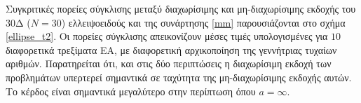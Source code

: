 Συγκριτικές πορείες σύγκλισης μεταξύ διαχωρίσιμης και μη-διαχωρίσιμης εκδοχής του $30$Δ ($N\!=\!30$) ελλειψοειδούς και της συνάρτησης \ref{mm} παρουσιάζονται στο σχήμα \ref{ellipse_t2}. Οι πορείες σύγκλισης απεικονίζουν μέσες τιμές υπολογισμένες για $10$ διαφορετικά τρεξίματα ΕΑ, με διαφορετική αρχικοποίηση της γεννήτριας τυχαίων αριθμών.  Παρατηρείται ότι, και στις δύο περιπτώσεις η διαχωρίσιμη εκδοχή των προβλημάτων υπερτερεί σημαντικά σε ταχύτητα της μη-διαχωρίσιμης εκδοχής αυτών. Το κέρδος  είναι σημαντικά μεγαλύτερο στην περίπτωση όπου $a=\infty$.        

\begin{figure}[h!]
\begin{minipage}[b]{0.5\linewidth}
 \centering
\end{minipage}
\begin{minipage}[b]{0.5\linewidth}
 \centering

\end{minipage}
\end{figure}
